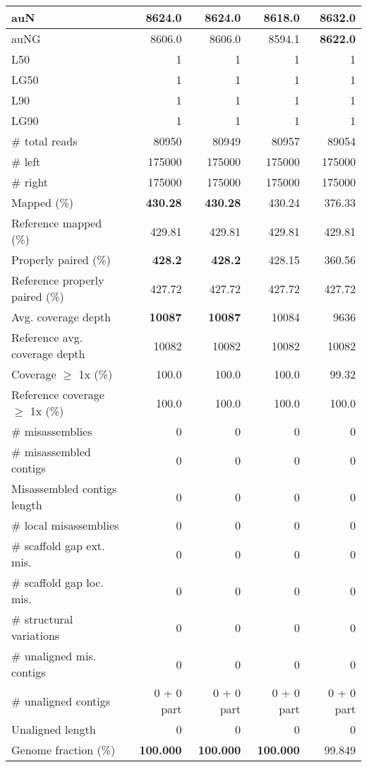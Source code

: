 \documentclass[12pt,a4paper]{article}
\begin{document}
\begin{table}[ht]
\begin{center}
\begin{tabular}{|l*{4}{|r}|}
auN & 8624.0 & 8624.0 & 8618.0 & {\bf 8632.0} \\ \hline
auNG & 8606.0 & 8606.0 & 8594.1 & {\bf 8622.0} \\ \hline
L50 & 1 & 1 & 1 & 1 \\ \hline
LG50 & 1 & 1 & 1 & 1 \\ \hline
L90 & 1 & 1 & 1 & 1 \\ \hline
LG90 & 1 & 1 & 1 & 1 \\ \hline
\# total reads & 80950 & 80949 & 80957 & 89054 \\ \hline
\# left & 175000 & 175000 & 175000 & 175000 \\ \hline
\# right & 175000 & 175000 & 175000 & 175000 \\ \hline
Mapped (\%) & {\bf 430.28} & {\bf 430.28} & 430.24 & 376.33 \\ \hline
Reference mapped (\%) & 429.81 & 429.81 & 429.81 & 429.81 \\ \hline
Properly paired (\%) & {\bf 428.2} & {\bf 428.2} & 428.15 & 360.56 \\ \hline
Reference properly paired (\%) & 427.72 & 427.72 & 427.72 & 427.72 \\ \hline
Avg. coverage depth & {\bf 10087} & {\bf 10087} & 10084 & 9636 \\ \hline
Reference avg. coverage depth & 10082 & 10082 & 10082 & 10082 \\ \hline
Coverage $\geq$ 1x (\%) & 100.0 & 100.0 & 100.0 & 99.32 \\ \hline
Reference coverage $\geq$ 1x (\%) & 100.0 & 100.0 & 100.0 & 100.0 \\ \hline
\# misassemblies & 0 & 0 & 0 & 0 \\ \hline
\# misassembled contigs & 0 & 0 & 0 & 0 \\ \hline
Misassembled contigs length & 0 & 0 & 0 & 0 \\ \hline
\# local misassemblies & 0 & 0 & 0 & 0 \\ \hline
\# scaffold gap ext. mis. & 0 & 0 & 0 & 0 \\ \hline
\# scaffold gap loc. mis. & 0 & 0 & 0 & 0 \\ \hline
\# structural variations & 0 & 0 & 0 & 0 \\ \hline
\# unaligned mis. contigs & 0 & 0 & 0 & 0 \\ \hline
\# unaligned contigs & 0 + 0 part & 0 + 0 part & 0 + 0 part & 0 + 0 part \\ \hline
Unaligned length & 0 & 0 & 0 & 0 \\ \hline
Genome fraction (\%) & {\bf 100.000} & {\bf 100.000} & {\bf 100.000} & 99.849 \\ \hline

\end{tabular}
\end{center}
\end{table}
\end{document}
